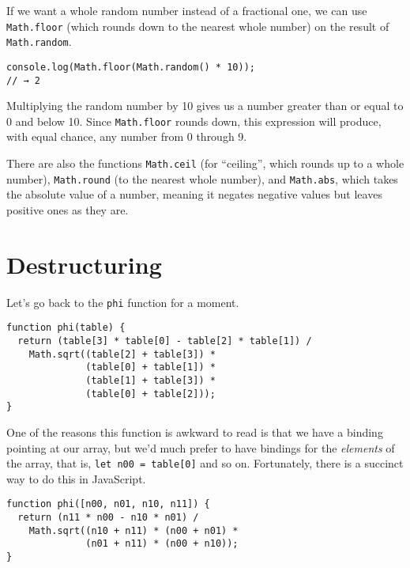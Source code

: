 If we want a whole random number instead of a fractional one, we can use \lstinline`Math.floor` (which rounds down to the nearest whole number) on the result of \lstinline`Math.random`.

\begin{lstlisting}
console.log(Math.floor(Math.random() * 10));
// → 2
\end{lstlisting}
\noindent

Multiplying the random number by 10 gives us a number greater than or equal to 0 and below 10. Since \lstinline`Math.floor` rounds down, this expression will produce, with equal chance, any number from 0 through 9.

There are also the functions \lstinline`Math.ceil` (for ``ceiling'', which rounds up to a whole number), \lstinline`Math.round` (to the nearest whole number), and \lstinline`Math.abs`, which takes the absolute value of a number, meaning it negates negative values but leaves positive ones as they are.

\section{Destructuring}

Let's go back to the \lstinline`phi` function for a moment.

\begin{lstlisting}
function phi(table) {
  return (table[3] * table[0] - table[2] * table[1]) /
    Math.sqrt((table[2] + table[3]) *
              (table[0] + table[1]) *
              (table[1] + table[3]) *
              (table[0] + table[2]));
}
\end{lstlisting}
\noindent{}

One of the reasons this function is awkward to read is that we have a binding pointing at our array, but we'd much prefer to have bindings for the \emph{elements} of the array, that is, \lstinline`let n00 = table[0]` and so on. Fortunately, there is a succinct way to do this in JavaScript.

\begin{lstlisting}
function phi([n00, n01, n10, n11]) {
  return (n11 * n00 - n10 * n01) /
    Math.sqrt((n10 + n11) * (n00 + n01) *
              (n01 + n11) * (n00 + n10));
}
\end{lstlisting}
\noindent{}

